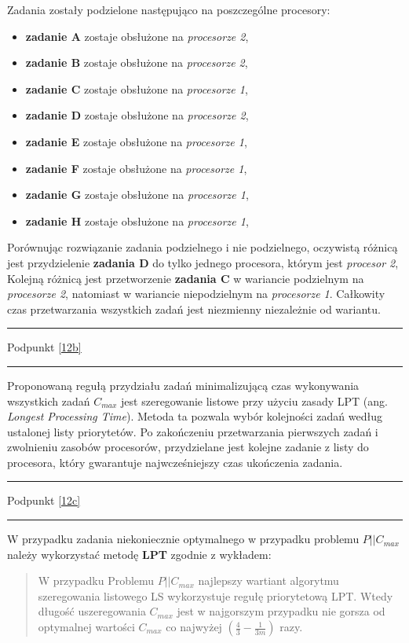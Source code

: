 \documentclass[
    12pt, %
]{../fphw}
\begin{document}
\newpage

Zadania zostały podzielone następująco na poszczególne procesory:
\begin{itemize}
    \item \textbf{zadanie A} zostaje obsłużone na \textit{procesorze 2},
    \item \textbf{zadanie B} zostaje obsłużone na \textit{procesorze 2},
    \item \textbf{zadanie C} zostaje obsłużone na \textit{procesorze 1},
    \item \textbf{zadanie D} zostaje obsłużone na \textit{procesorze 2},
    \item \textbf{zadanie E} zostaje obsłużone na \textit{procesorze 1},
    \item \textbf{zadanie F} zostaje obsłużone na \textit{procesorze 1},
    \item \textbf{zadanie G} zostaje obsłużone na \textit{procesorze 1},
    \item \textbf{zadanie H} zostaje obsłużone na \textit{procesorze 1},
\end{itemize}

Porównując rozwiązanie zadania podzielnego i nie podzielnego,
oczywistą różnicą jest przydzielenie \textbf{zadania D} do tylko jednego procesora,
którym jest \textit{procesor 2},
Kolejną różnicą jest przetworzenie \textbf{zadania C} w wariancie podzielnym
na \textit{procesorze 2}, natomiast w wariancie niepodzielnym na \textit{procesorze 1}.
Całkowity czas przetwarzania wszystkich zadań jest niezmienny niezależnie od wariantu.
\par\noindent\rule{\textwidth}{0.4pt}
Podpunkt \ref{12b}
\par\noindent\rule{\textwidth}{0.4pt}
Proponowaną regułą przydziału zadań minimalizującą czas wykonywania wszystkich
zadań \(C_{max}\) jest szeregowanie listowe przy użyciu zasady LPT (ang. \textit{Longest Processing Time}).
Metoda ta pozwala wybór kolejności zadań według ustalonej listy priorytetów.
Po zakończeniu przetwarzania pierwszych zadań i zwolnieniu zasobów
procesorów, przydzielane jest kolejne zadanie z listy do procesora,
który gwarantuje najwcześniejszy czas ukończenia zadania.

\par\noindent\rule{\textwidth}{0.4pt}
Podpunkt \ref{12c}
\par\noindent\rule{\textwidth}{0.4pt}
W przypadku zadania niekoniecznie optymalnego w przypadku problemu \(P||C_{max}\)
należy wykorzystać metodę \textbf{LPT} zgodnie z wykładem:
\begin{quote}
    W przypadku Problemu \(P ||C_{max}\) najlepszy wartiant algorytmu szeregowania listowego LS wykorzystuje regułę priorytetową LPT.
    Wtedy długość uszeregowania \(C_{max}\) jest w najgorszym przypadku nie gorsza od optymalnej wartości \(C_{max}\)
    co najwyżej \( (\frac{4}{3} - \frac{1}{3m} )\) razy.
\end{quote}
\newpage
\end{document}
